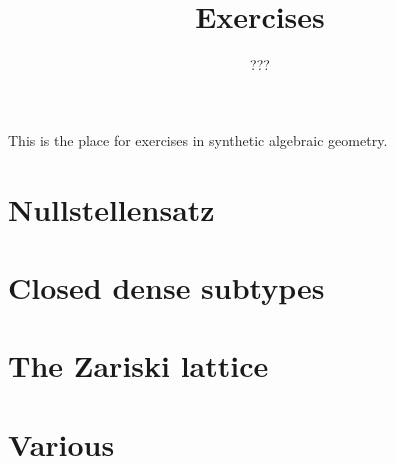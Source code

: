 \documentclass{../util/zariski-small}
\title{Exercises}
\theoremstyle{break}
\begin{document}
\author{???}

\maketitle

This is the place for exercises in synthetic algebraic geometry.

\section{Nullstellensatz}


\section{Closed dense subtypes}


\section{The Zariski lattice}


\section{Various}


\printbibliography
\end{document}
